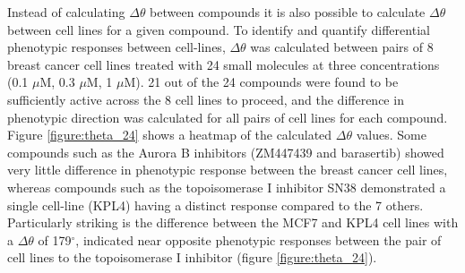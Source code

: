 \documentclass[a4paper,11pt,twoside,openright]{scrbook}
\begin{document}
Instead of calculating $\Delta\theta$ between compounds it is also possible to calculate $\Delta\theta$ between cell 
lines for a given compound.
To identify and quantify differential phenotypic responses between cell-lines, $\Delta\theta$ was calculated between 
pairs of 8 breast cancer cell lines treated with 24 small molecules at three concentrations (0.1 $\mu$M, 0.3 $\mu$M, 1 
$\mu$M).
21 out of the 24 compounds were found to be sufficiently active across the 8 cell lines to proceed, and the difference 
in phenotypic direction was calculated for all pairs of cell lines for each compound.
Figure \ref{figure:theta_24} shows a heatmap of the calculated $\Delta\theta$ values.
Some compounds such as the Aurora B inhibitors (ZM447439 and barasertib) showed very little difference in phenotypic 
response between the breast cancer cell lines, whereas compounds such as the topoisomerase I inhibitor SN38 
demonstrated a single cell-line (KPL4) having a distinct response compared to the 7 others.
Particularly striking is the difference between the MCF7 and KPL4 cell lines with a $\Delta\theta$ of 179$^\circ$, 
indicated near opposite phenotypic responses between the pair of cell lines to the topoisomerase I inhibitor (figure 
\ref{figure:theta_24}).
\end{document}

